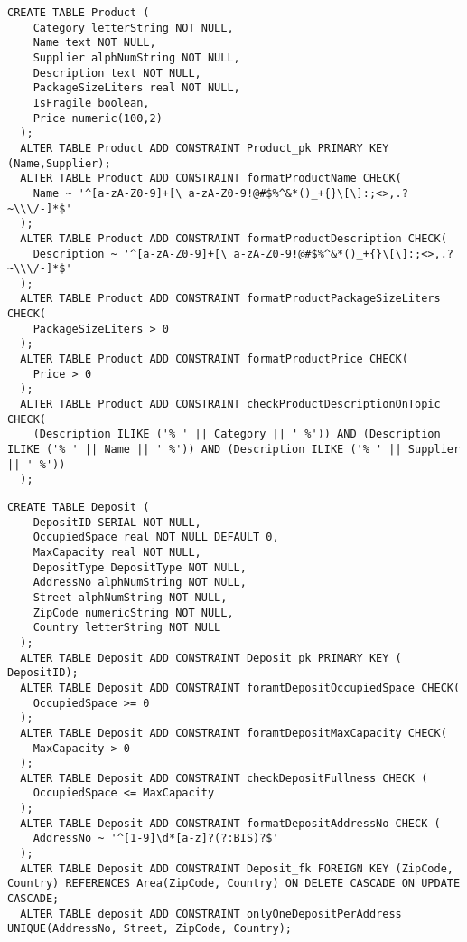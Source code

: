 \begin{lstlisting}[caption={Creazione della tabella \textbf{Product}}]
  CREATE TABLE Product (
    Category letterString NOT NULL,
    Name text NOT NULL,
    Supplier alphNumString NOT NULL,
    Description text NOT NULL,
    PackageSizeLiters real NOT NULL,
    IsFragile boolean,
    Price numeric(100,2)
  );
  ALTER TABLE Product ADD CONSTRAINT Product_pk PRIMARY KEY (Name,Supplier);
  ALTER TABLE Product ADD CONSTRAINT formatProductName CHECK(
    Name ~ '^[a-zA-Z0-9]+[\ a-zA-Z0-9!@#$%^&*()_+{}\[\]:;<>,.?~\\\/-]*$'
  );
  ALTER TABLE Product ADD CONSTRAINT formatProductDescription CHECK(
    Description ~ '^[a-zA-Z0-9]+[\ a-zA-Z0-9!@#$%^&*()_+{}\[\]:;<>,.?~\\\/-]*$'
  );
  ALTER TABLE Product ADD CONSTRAINT formatProductPackageSizeLiters CHECK(
    PackageSizeLiters > 0
  );
  ALTER TABLE Product ADD CONSTRAINT formatProductPrice CHECK(
    Price > 0
  );
  ALTER TABLE Product ADD CONSTRAINT checkProductDescriptionOnTopic CHECK(
    (Description ILIKE ('% ' || Category || ' %')) AND (Description ILIKE ('% ' || Name || ' %')) AND (Description ILIKE ('% ' || Supplier || ' %'))
  );
\end{lstlisting}


\begin{lstlisting}[caption={Creazione della tabella \textbf{Deposit}}]
  CREATE TABLE Deposit (
    DepositID SERIAL NOT NULL,
    OccupiedSpace real NOT NULL DEFAULT 0,
    MaxCapacity real NOT NULL,
    DepositType DepositType NOT NULL,
    AddressNo alphNumString NOT NULL,
    Street alphNumString NOT NULL,
    ZipCode numericString NOT NULL,
    Country letterString NOT NULL
  );
  ALTER TABLE Deposit ADD CONSTRAINT Deposit_pk PRIMARY KEY ( DepositID);
  ALTER TABLE Deposit ADD CONSTRAINT foramtDepositOccupiedSpace CHECK(
    OccupiedSpace >= 0
  );
  ALTER TABLE Deposit ADD CONSTRAINT foramtDepositMaxCapacity CHECK(
    MaxCapacity > 0
  );
  ALTER TABLE Deposit ADD CONSTRAINT checkDepositFullness CHECK (
    OccupiedSpace <= MaxCapacity
  );
  ALTER TABLE Deposit ADD CONSTRAINT formatDepositAddressNo CHECK (
    AddressNo ~ '^[1-9]\d*[a-z]?(?:BIS)?$'
  );
  ALTER TABLE Deposit ADD CONSTRAINT Deposit_fk FOREIGN KEY (ZipCode, Country) REFERENCES Area(ZipCode, Country) ON DELETE CASCADE ON UPDATE CASCADE;
  ALTER TABLE deposit ADD CONSTRAINT onlyOneDepositPerAddress UNIQUE(AddressNo, Street, ZipCode, Country);
\end{lstlisting}

